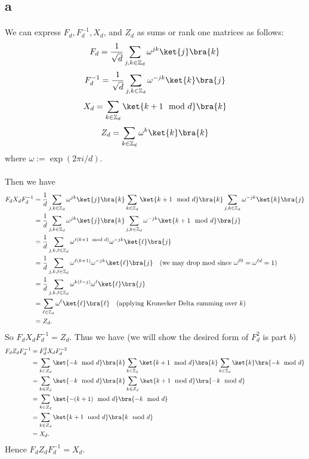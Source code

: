 \documentclass[letterpaper,12pt,oneside,onecolumn]{article}
\begin{document}
\section{}
\subsection{a}
\paragraph{}
We can express $F_d, F_d^{-1}, X_d$, and $Z_d$ as sums or rank one matrices as follows:
$$F_d = \frac{1}{\sqrt{d}} \sum_{j,k \in \Z_d} \omega^{j k} \ket{j}\bra{k}$$
$$F_d^{-1} = \frac{1}{\sqrt{d}} \sum_{j,k \in \Z_d} \omega^{- j k} \ket{k}\bra{j}$$
$$X_d = \sum_{k \in \Z_d} \ket{k+1 \mod d} \bra{k}$$
$$Z_d = \sum_{k \in \Z_d} \omega^k \ket{k}\bra{k}$$
where $\omega := \exp(2\pi i / d)$.
\paragraph{}
Then we have
\begin{align*}
F_dX_dF_d^{-1} &= \frac{1}{d} \sum_{j,k \in \Z_d} \omega^{j k} \ket{j}\bra{k}\sum_{k \in \Z_d} \ket{k+1 \mod d} \bra{k}\sum_{j,k \in \Z_d} \omega^{- j k} \ket{k}\bra{j}\\
&= \frac{1}{d} \sum_{j,k \in \Z_d} \omega^{j k} \ket{j}\bra{k} \sum_{j,k \in \Z_d} \omega^{- j k} \ket{k+1 \mod d}\bra{j} \\
&= \frac{1}{d} \sum_{j,k,\ell \in \Z_d}\omega^{\ell(k+1\mod d)}\omega^{-jk}\ket{\ell}\bra{j} \\
&=\frac{1}{d} \sum_{j,k,\ell \in \Z_d}\omega^{\ell(k+1)}\omega^{-jk}\ket{\ell}\bra{j}  \quad\text{(we may drop mod since $\omega^{\ell 0 } = \omega^{\ell d} = 1$)} \\
&= \frac{1}{d} \sum_{j,k,\ell \in \Z_d}\omega^{k(\ell-j)}\omega^{\ell}\ket{\ell}\bra{j} \\
&= \sum_{\ell \in \Z_d} \omega^\ell \ket{\ell}\bra{\ell} \quad \text{(applying Kronecker Delta summing over $k$)} \\
&= Z_d.
\end{align*}
So $F_d X_d F_d^{-1} = Z_d$. Thus we have (we will show the desired form of $F_d^2$ is part $b$)
\begin{align*}
F_dZ_d F_d^{-1} &= F_d^2 X_d F_d^{-2} \\
&= \sum_{k \in Z_d} \ket{-k \mod d} \bra{k} \sum_{k \in \Z_d} \ket{k+1 \mod d}\bra{k} \sum_{k \in \Z_d} \ket{k}\bra{-k\mod d} \\
&= \sum_{k \in Z_d} \ket{-k \mod d} \bra{k} \sum_{k \in Z_d}\ket{k+1 \mod d}\bra{-k \mod d} \\
&= \sum_{k \in Z_d} \ket{-(k+1) \mod d} \bra{- k \mod d} \\
&= \sum_{k \in Z_d} \ket{k+1 \mod d} \bra{k \mod d} \\
&= X_d.
\end{align*}
Hence $F_d Z_d F_d^{-1} = X_d$.
\end{document}

